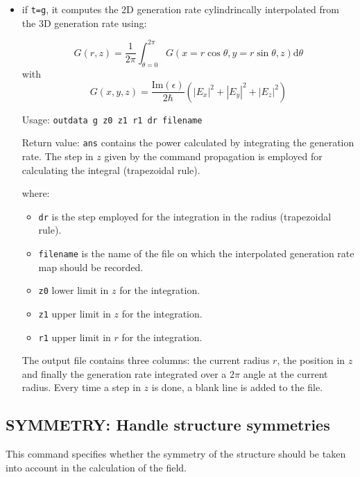 \begin{itemize}
\begin{itemize}
        \item if \lstinline!t=g!, it computes the 2D generation rate cylindrincally 
        interpolated from the 3D generation rate using:

        \begin{equation}
        G(r,z)= \frac{1}{2\pi}\int_{\theta=0}^{2\pi} G(x=r \cos \theta, y = r \sin \theta, z) \mathrm{d}\theta
        \end{equation}
        with 
        \begin{equation}
        G(x,y,z)= \frac{\mathrm{Im}(\epsilon)}{2\hbar}\left(|E_x|^2 + |E_y|^2 +|E_z|^2 \right)
        \end{equation}
    
        Usage: \lstinline!outdata g z0 z1 r1 dr filename! 
        
        Return value: \lstinline!ans! contains the power calculated by integrating the generation rate. The step in $z$ given by the command propagation is employed for calculating the integral (trapezoidal rule).

        where: 
        \begin{itemize}
        \item \lstinline!dr! is the step employed for the integration in the radius (trapezoidal rule).
        \item \lstinline!filename! is the name of the file on which the interpolated generation rate map should be  recorded.
        \item \lstinline!z0! lower limit in $z$ for the integration.
        \item \lstinline!z1! upper limit in $z$ for the integration.
        \item \lstinline!r1! upper limit in $r$ for the integration.
        \end{itemize}
        The output file contains three columns: the current radius $r$, the position in $z$ and finally the generation rate integrated over a $2\pi$ angle at the current radius. Every time a step in $z$ is done, a blank line is added to the file.
    \end{itemize}

\end{itemize}


\subsection{SYMMETRY: Handle structure symmetries}
This command specifies whether the symmetry of the structure should be taken
into account in the calculation of the field.
     
